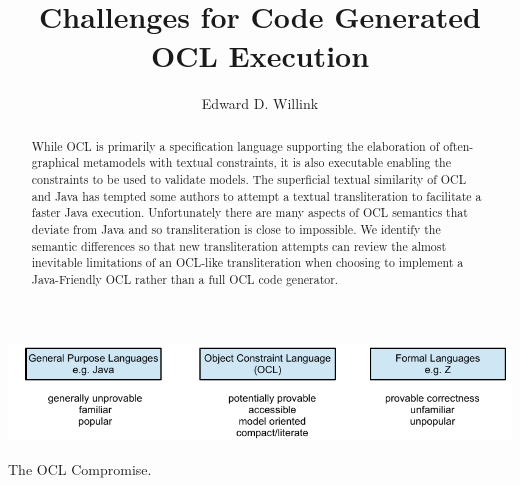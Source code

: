 \documentclass[sigconf]{acmart}
\begin{document}
\title{Challenges for Code Generated OCL Execution}

\author{Edward D. Willink}


\begin{abstract}
  While OCL is primarily a specification language supporting the elaboration of often-graphical metamodels with textual constraints, it is also executable enabling the constraints to be used to validate models. The superficial textual similarity of OCL and Java has tempted some authors to attempt a textual transliteration to facilitate a faster Java execution. Unfortunately there are many aspects of OCL semantics that deviate from Java and so transliteration is close to impossible. We identify the semantic differences so that new transliteration attempts can review the almost inevitable limitations of an OCL-like transliteration when choosing to implement a Java-Friendly OCL rather than a full OCL code generator.
\end{abstract}


\begin{teaserfigure}
  \includegraphics[width=\textwidth]{OCLteaser.pdf}
  \caption{The OCL Compromise.}
  \label{fig:teaser}
\end{teaserfigure}
\end{document}
